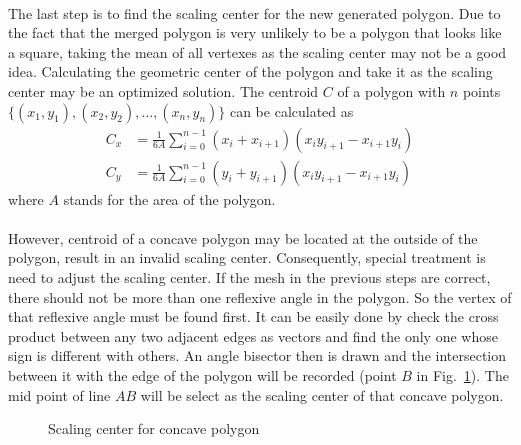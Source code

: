 \paragraph{}
The last step is to find the scaling center for the new generated polygon.
Due to the fact that the merged polygon is very unlikely to be a polygon that looks like a square, taking the mean of all vertexes as the scaling center may not be a good idea.
Calculating the geometric center of the polygon and take it as the scaling center may be an optimized solution.
The centroid $C$ of a polygon with $n$ points $\{(x_1,y_1),(x_2,y_2),\dots,(x_n,y_n)\}$ can be calculated as
\begin{equation}
    \begin{aligned}
        C_x &= \frac{1}{6A} \sum_{i=0}^{n-1}\left(
            x_i + x_{i+1}    
        \right) \left(
            x_i y_{i+1} - x_{i+1} y_i
        \right) \\
        C_y &= \frac{1}{6A} \sum_{i=0}^{n-1}\left(
            y_i + y_{i+1}    
        \right) \left(
            x_i y_{i+1} - x_{i+1} y_i
        \right)
    \end{aligned}
\end{equation}
where $A$ stands for the area of the polygon.

\paragraph{}
However, centroid of a concave polygon may be located at the outside of the polygon, result in an invalid scaling center.
Consequently, special treatment is need to adjust the scaling center.
If the mesh in the previous steps are correct, there should not be more than one reflexive angle in the polygon.
So the vertex of that reflexive angle must be found first.
It can be easily done by check the cross product between any two adjacent edges as vectors and find the only one whose sign is different with others.
An angle bisector then is drawn and the intersection between it with the edge of the polygon will be recorded (point $B$ in Fig.~\ref{adap_fig:mt_concave_sc}).
The mid point of line $AB$ will be select as the scaling center of that concave polygon.

\begin{figure}[!ht]
    \centering
    \caption[Scaling center for concave polygon]{Scaling center for concave polygon}
    \label{adap_fig:mt_concave_sc}
\end{figure}

\pagebreak